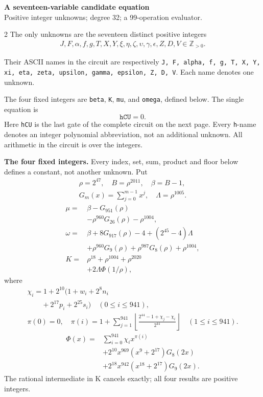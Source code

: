 \documentclass[10pt]{article}
\newcommand{\fl}[1]{\left\lfloor#1\right\rfloor}
\begin{document}
\begin{center}
{\large\bfseries A seventeen-variable candidate equation}\\[-1pt]
{\small Positive integer unknowns; degree 32; a 99-operation evaluator.}
\end{center}\vspace{-8pt}
\begin{multicols}{2}
\fontsize{8.6}{9.1}\selectfont
The only unknowns are the seventeen distinct positive integers
\[
\begin{gathered}J,F,\alpha,f,g,T,X,Y,\xi,\eta,\zeta,\upsilon,\gamma,\epsilon,Z,D,V\in\mathbb Z_{>0}.\end{gathered}
\]
{\raggedright Their ASCII names in the circuit are respectively
\texttt{J, F, alpha, f, g, T, X, Y, xi, eta, zeta, upsilon, gamma, epsilon, Z, D, V}. Each name denotes one unknown.\par}
The four fixed integers are \texttt{beta}, \texttt{K}, \texttt{mu}, and
\texttt{omega}, defined below. The single equation is
\[
\boxed{\texttt{hCU}=0.}
\]
Here \texttt{hCU} is the last gate of the complete circuit on the next page.
Every \texttt{h}-name denotes an integer polynomial abbreviation, not an
additional unknown. All arithmetic in the circuit is over the integers.

\textbf{The four fixed integers.}
Every index, set, sum, product and floor below defines a constant, not
another unknown. Put
\[
\begin{gathered}
\rho=2^{47},\quad B=\rho^{2011},\quad\beta=B-1,\\
G_m(x)=\sum_{j=0}^{m-1}x^j,\quad
\Lambda=\rho^{1005}.
\end{gathered}
\]
\begin{align*}
\mu={}&\beta-G_{951}(\rho)\\
&-\rho^{960}G_{26}(\rho)-\rho^{1004},\\
\omega={}&\beta+8G_{917}(\rho)-4+(2^{45}-4)\Lambda\\
&+\rho^{960}G_9(\rho)+\rho^{987}G_8(\rho)
  +\rho^{1004},\\
K={}&\rho^{18}+\rho^{1004}+\rho^{2020}\\
&+2\Lambda\Phi(1/\rho),
\end{align*}
where
\[
\begin{gathered}
\chi_i=1+2^{10}(1+w_i+2^8n_i\\
\qquad+2^{17}p_i+2^{25}s_i)\quad(0\le i\le941),\\
\pi(0)=0,\quad\pi(i)=1+\sum_{j=1}^{941}
\fl{\frac{2^{44}-1+\chi_j-\chi_i}{2^{44}}}\quad(1\le i\le941).
\end{gathered}
\]
\[
\begin{split}
\Phi(x)={}&\sum_{i=0}^{941}\chi_i x^{\pi(i)}\\
&+2^{10}x^{969}(x^9+2^{17})G_8(2x)\\
&+2^{18}x^{942}(x^{18}+2^{17})G_9(2x).
\end{split}
\]
The rational intermediate in K cancels exactly; all four results are positive integers.


\end{multicols}
\end{document}
